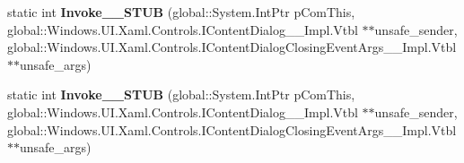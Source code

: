 \begin{DoxyCompactItemize}
\mbox{\label{struct_windows_1_1_foundation_1_1_typed_event_handler___a___windows___u_i___xaml___controls___co9111ad08139b8b08fa2d56786ea22dd0_a454bd13651d402c529747d41a5c05eeb}} 
static int {\bfseries Invoke\+\_\+\+\_\+\+S\+T\+UB} (global\+::\+System.\+Int\+Ptr p\+Com\+This, global\+::\+Windows.\+U\+I.\+Xaml.\+Controls.\+I\+Content\+Dialog\+\_\+\+\_\+\+Impl.\+Vtbl $\ast$$\ast$unsafe\+\_\+sender, global\+::\+Windows.\+U\+I.\+Xaml.\+Controls.\+I\+Content\+Dialog\+Closing\+Event\+Args\+\_\+\+\_\+\+Impl.\+Vtbl $\ast$$\ast$unsafe\+\_\+args)
\item 
\mbox{\label{struct_windows_1_1_foundation_1_1_typed_event_handler___a___windows___u_i___xaml___controls___co9111ad08139b8b08fa2d56786ea22dd0_a454bd13651d402c529747d41a5c05eeb}} 
static int {\bfseries Invoke\+\_\+\+\_\+\+S\+T\+UB} (global\+::\+System.\+Int\+Ptr p\+Com\+This, global\+::\+Windows.\+U\+I.\+Xaml.\+Controls.\+I\+Content\+Dialog\+\_\+\+\_\+\+Impl.\+Vtbl $\ast$$\ast$unsafe\+\_\+sender, global\+::\+Windows.\+U\+I.\+Xaml.\+Controls.\+I\+Content\+Dialog\+Closing\+Event\+Args\+\_\+\+\_\+\+Impl.\+Vtbl $\ast$$\ast$unsafe\+\_\+args)
\end{DoxyCompactItemize}
